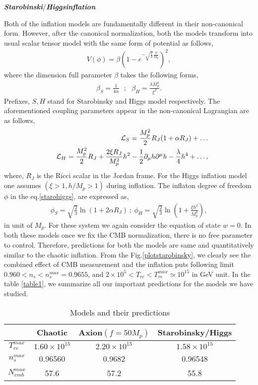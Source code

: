 \documentclass[prl,twocolumn,superscriptaddress,doublespace]{revtex4}%
\def\bea{\begin{eqnarray}}
\def\eea{\end{eqnarray}}
\def\pr{\partial}
\def\nno{\nonumber}
\begin{document}
{\vskip 0.2cm
\textbf {\textit {Starobinski}}\cite{starobinsky}/\textbf{\textit {Higgs}}\cite{higgs}\textbf{\textit{inflation}}


Both of the inflation models are fundamentally different in their non-canonical form. 
However, after the canonical normalization, both the models transform into usual scalar tensor model with the same form of potential as follows,
\bea \label{starohiggs}
V(\phi)=\beta \left(1 - e^{-\sqrt{\frac{2}{3}} \frac {\phi}{M_p}} \right)^2 ,
\eea
where the dimension full parameter $\beta$ takes the following forms,
\bea
\beta_{S} = \frac {1} {4 \alpha}~~~;~~~
\beta_{H} = \frac  {\lambda M_p^4}{\xi^2} .
\eea
Prefixes, $S,H$ stand for Starobinsky and Higgs model respectively.
The aforementioned coupling parameters appear in the non-canonical Lagrangian are as follows,  
\bea
&&{\cal L}_{S} = \frac{M_p^2}{2} R_J(1 + \alpha R_J) + \dots \\
&&{\cal L}_{H} =\frac{M_p^2}{2} R_J + 
\frac{2\xi R_J}{M_p^2}h^2 -\frac 1 2 \pr_{\mu}h \pr^{\mu}h - \frac {\lambda}{4} h^4+ \dots , \nno
\eea 
where, $R_J$ is the Ricci scalar in the Jordan frame.
For the Higgs inflation model one assumes $(\xi > 1, h/M_p > 1)$ during inflation. The inflaton degree of freedom $\phi$ in the  eq.\ref{starohiggs}, are expressed as,
\bea
\phi_{S} = \sqrt{\frac{2}{3}} \ln \left(1+ 2 \alpha R_J \right) ~;~
\phi_{H} = \sqrt{\frac{2 }{3}} \ln \left(1+ \frac{\xi h^2} {M_p^2} \right), \nno
\eea 
in unit of $M_p$. For these system we again consider the equation of state $w=0$. In both these models once we fix the CMB normalization, there is no free parameter to control. Therefore, predictions for both the models are same and quantitatively similar to the chaotic inflation.
From the Fig.\ref{plotstarobinsky}, we clearly see
the combined effect of CMB measurement and the inflation puts following limit $0.960 < n_s < n_s^{max}= 0.9655$, and $ 2\times 10^5 < T_{re} < T_{re}^{max} \simeq 10^{15} $ in GeV unit. In the table \ref{table1}, we summarize all our important predictions for the models we have studied.
\begin{table}
	\caption{Models and their predictions}
	\begin{tabular}{|c|c|c|c|}
		\hline
		\hline
	     & Chaotic & Axion$(f=50M_p)$& Starobinsky/Higgs \\
		\hline
		$T_{re}^{max}$  &$1.60 \times 10^{15}$ & $2.20 \times 10^{15}$ & $1.58 \times 10^{15}$\\
		\hline
		$n_s^{max}$ & 0.96560 &0.9682&0.96548 \\
		\hline
		$N^{max}_{cmb}$ &57.6 &57.2& 55.8\\
				\hline
				

\end{tabular}
\end{table}}
\end{document}
